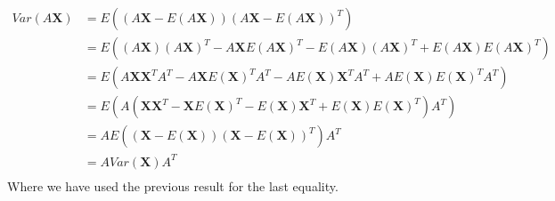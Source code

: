 \documentclass{article}
\begin{document}
\begin{align*}
    Var(A \mathbf{X}) & = E((A \mathbf{X} - E(A \mathbf{X})) (A \mathbf{X} - E(A \mathbf{X}))^T)                                                                       \\
                      & = E((A \mathbf{X})(A \mathbf{X})^T  - A \mathbf{X} E(A \mathbf{X})^T - E(A \mathbf{X}) (A \mathbf{X})^T + E(A \mathbf{X}) E(A \mathbf{X})^T)   \\
                      & = E(A \mathbf{X}\mathbf{X}^T A^T  - A \mathbf{X} E(\mathbf{X})^T A^T - A E(\mathbf{X}) \mathbf{X}^T A^T + A E(\mathbf{X}) E(\mathbf{X})^T A^T) \\
                      & = E(A (\mathbf{X}\mathbf{X}^T  - \mathbf{X} E(\mathbf{X})^T - E(\mathbf{X}) \mathbf{X}^T + E(\mathbf{X}) E(\mathbf{X})^T ) A^T)                \\
                      & = A E((\mathbf{X} - E(\mathbf{X})) (\mathbf{X} - E(\mathbf{X}))^T) A^T                                                                         \\
                      & = A Var(\mathbf{X}) A^T                                                                                                                        \\
\end{align*}
Where we have used the previous result for the last equality.


\end{document}
